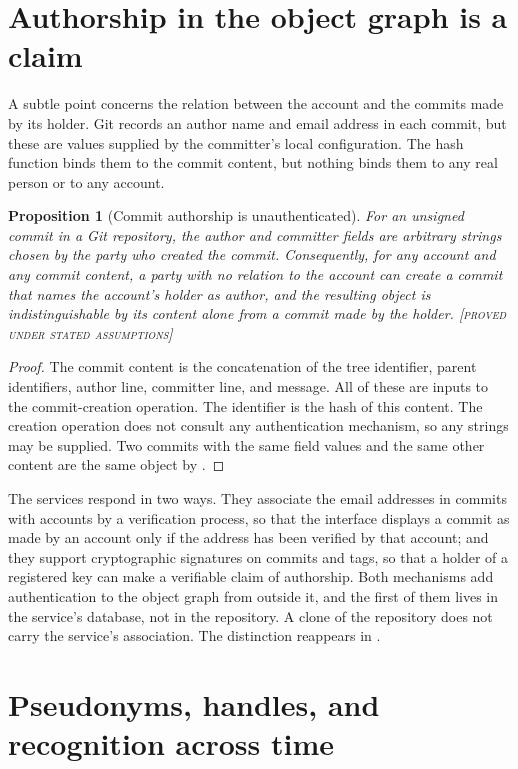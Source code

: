 \documentclass[11pt,twoside,openright]{book}
\theoremstyle{plain}
\newtheorem{proposition}[theorem]{Proposition}
\theoremstyle{definition}
\theoremstyle{remark}
\newcommand{\Proved}{\textup{\textsc{[proved under stated assumptions]}}}
\begin{document}
\section{Authorship in the object graph is a claim}

A subtle point concerns the relation between the account and the commits made by its holder. Git records an author name and email address in each commit, but these are values supplied by the committer's local configuration. The hash function binds them to the commit content, but nothing binds them to any real person or to any account.

\begin{proposition}[Commit authorship is unauthenticated]\label{prop:unauth}
For an unsigned commit in a Git repository, the author and committer fields are arbitrary strings chosen by the party who created the commit. Consequently, for any account and any commit content, a party with no relation to the account can create a commit that names the account's holder as author, and the resulting object is indistinguishable by its content alone from a commit made by the holder.
\Proved{}
\end{proposition}

\begin{proof}
The commit content is the concatenation of the tree identifier, parent identifiers, author line, committer line, and message. All of these are inputs to the commit-creation operation. The identifier is the hash of this content. The creation operation does not consult any authentication mechanism, so any strings may be supplied. Two commits with the same field values and the same other content are the same object by .
\end{proof}

The services respond in two ways. They associate the email addresses in commits with accounts by a verification process, so that the interface displays a commit as made by an account only if the address has been verified by that account; and they support cryptographic signatures on commits and tags, so that a holder of a registered key can make a verifiable claim of authorship. Both mechanisms add authentication to the object graph from outside it, and the first of them lives in the service's database, not in the repository. A clone of the repository does not carry the service's association. The distinction reappears in .

\section{Pseudonyms, handles, and recognition across time}
\end{document}
